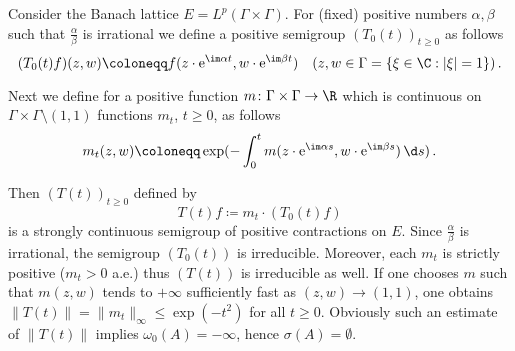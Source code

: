 \begin{example}\label{ex:c3-3.6}

Consider the Banach lattice $E = L^{p}(\Gamma\times\Gamma)$.
For (fixed) positive numbers $\alpha,\beta$ such that $\frac{\alpha}{\beta}$ is irrational we define a positive semigroup $(T_{0}(t))_{t\geq 0}$ as follows
\begin{equation}\label{eq:c3-3.9}
	(T_{0}(t)f)(z,w) \coloneqq f(z\cdot \mathrm{e}^{\im\alpha t},w\cdot \mathrm{e}^{\im\beta t}) \quad (z,w \in \Gamma = \{\xi\in\C :|\xi|=1\})\,.
\end{equation}

Next we define for a positive function $m \colon \Gamma\times\Gamma \to \R $ which is continuous on $\Gamma\times\Gamma\setminus(1,1)$ functions $m_{t}$, $t\geq 0$, as follows
\begin{equation}\label{eq:c3-3.10}
	m_{t}(z,w) \coloneqq \exp(-\int_{0}^{t} m(z\cdot \mathrm{e}^{\im\alpha s},w\cdot \mathrm{e}^{\im\beta s})\,\d s)\,.
\end{equation}

Then $(T(t))_{t\geq 0}$ defined by
\begin{equation}\label{eq:c3-3.11}
	T(t)f \coloneqq m_{t}\cdot(T_{0}(t)f)
\end{equation}
is a strongly continuous semigroup of positive contractions on $E$.
Since $\frac{\alpha}{\beta}$ is irrational, the semigroup $(T_{0}(t))$ is irreducible.
Moreover, each $m_{t}$ is strictly positive (\ie  $m_{t} > 0$ a.e.) thus $(T(t))$ is irreducible as well.
If one chooses $m$ such that $m(z,w)$ tends to $+\infty$ sufficiently fast as $(z,w) \to (1,1)$, one obtains $\|T(t)\| = \|m_{t}\|_{\infty} \leq \exp(-t^{2})$ for all $t \geq 0$.
Obviously such an estimate of $\|T(t)\|$ implies $\omega_0(A) = -\infty$, hence $\sigma(A) = \emptyset$.
\end{example}

